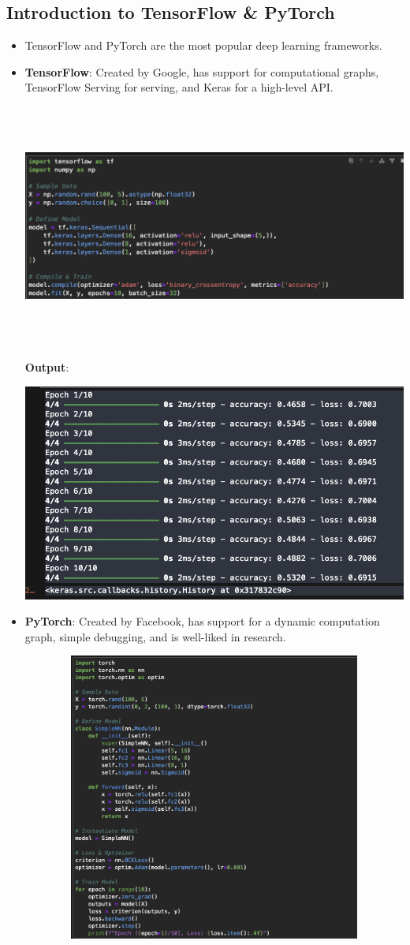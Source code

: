 \documentclass{article}
\begin{document}
\subsection{Introduction to TensorFlow \& PyTorch}
\begin{itemize}
\item TensorFlow and PyTorch are the most popular deep learning frameworks.
\item \textbf{TensorFlow}: Created by Google, has support for computational graphs, TensorFlow Serving for serving, and Keras for a high-level API.

\includegraphics[width=14cm,height=8cm]{TensorFlow.png}


\textbf{Output}:

\includegraphics[width=14cm,height=4
cm]{TensorFlow_Output.png}
\item \textbf{PyTorch}: Created by Facebook, has support for a dynamic computation graph, simple debugging, and is well-liked in research.

\includegraphics[width=14cm,height=9.5cm]{PyTorch.png}



\end{itemize}
\end{document}
